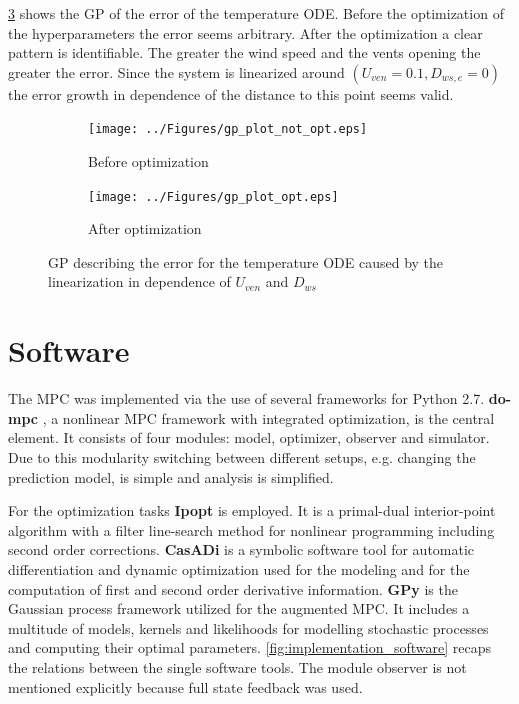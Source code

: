 \cref{fig:gp_optimization} shows the GP of the error of the temperature ODE.
Before the optimization of the hyperparameters the error seems arbitrary.
After the optimization a clear pattern is identifiable.
The greater the wind speed and the vents opening the greater the error.
Since the system is linearized around $(U_{ven} = 0.1, D_{ws,e} = 0)$ the error growth in dependence of the distance to this point seems valid.

\begin{figure}[t]
\begin{center}
	\begin{subfigure}[t]{.49\textwidth}
	\centering
		\texttt{[image: ../Figures/gp\_plot\_not\_opt.eps]}
		\caption{Before optimization}
		\label{fig:gp_before_opt}
	\end{subfigure}
	\hfill
	\begin{subfigure}[t]{.49\textwidth}
	\centering
		\texttt{[image: ../Figures/gp\_plot\_opt.eps]}
		\caption{After optimization}
		\label{fig:gp_after_opt}
	\end{subfigure}
\caption{GP describing the error for the temperature ODE caused by the linearization in dependence of $U_{ven}$ and $D_{ws}$}
\label{fig:gp_optimization}
\end{center}
\end{figure}


\section{Software}
\label{sec:software}

The MPC was implemented via the use of several frameworks for Python 2.7.
\textbf{do-mpc} \cite{Lucia.2017}, a nonlinear MPC framework with integrated optimization, is the central element.
It consists of four modules: model, optimizer, observer and simulator.
Due to this modularity switching between different setups, e.g. changing the prediction model, is simple and analysis is simplified.

For the optimization tasks \textbf{Ipopt} \cite{Wachter.2006} is employed.
It is a primal-dual interior-point algorithm with a filter line-search method for nonlinear programming including second order corrections.
\textbf{CasADi} \cite{Andersson.01.01.2013} is a symbolic software tool for automatic differentiation and dynamic optimization used for the modeling and for the computation of first and second order derivative information.
\textbf{GPy} \cite{GPy.since2012} is the Gaussian process framework utilized for the augmented MPC. It includes a multitude of models, kernels and likelihoods for modelling stochastic processes and computing their optimal parameters.
\cref{fig:implementation_software} recaps the relations between the single software tools.
The module observer is not mentioned explicitly because full state feedback was used.\par\medskip

